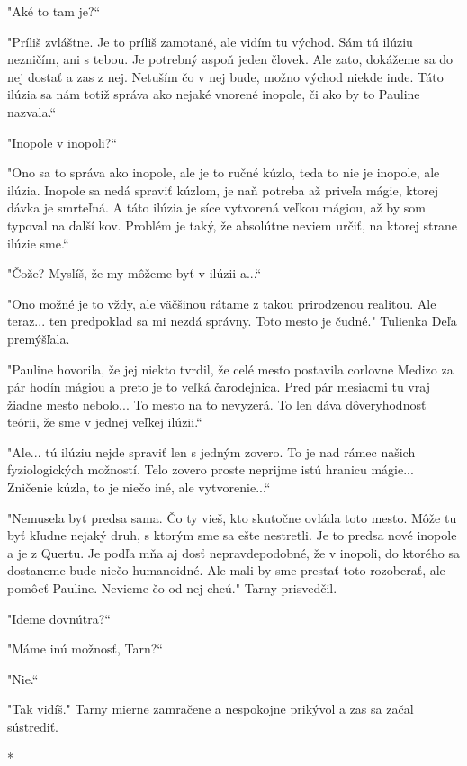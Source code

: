 \documentclass{book}
\begin{document}
"$ $Aké to tam je?“

"$ $Príliš zvláštne. Je to príliš zamotané, ale vidím tu východ. Sám tú ilúziu nezničím, ani s tebou. Je potrebný aspoň jeden človek. Ale zato, dokážeme sa do nej dostať a zas z nej. Netuším čo v nej bude, možno východ niekde inde. Táto ilúzia sa nám totiž správa ako nejaké vnorené inopole, či ako by to Pauline nazvala.“

"$ $Inopole v inopoli?“

"$ $Ono sa to správa ako inopole, ale je to ručné kúzlo, teda to nie je inopole, ale ilúzia. Inopole sa nedá spraviť kúzlom, je naň potreba až priveľa mágie, ktorej dávka je smrteľná. A táto ilúzia je síce vytvorená veľkou mágiou, až by som typoval na ďalší kov. Problém je taký, že absolútne neviem určiť, na ktorej strane ilúzie sme.“

"$ $Čože? Myslíš, že my môžeme byť v ilúzii a...“

"$ $Ono možné je to vždy, ale väčšinou rátame z takou prirodzenou realitou. Ale teraz... ten predpoklad sa mi nezdá správny. Toto mesto je čudné."$ $ Tulienka Deľa premýšľala.

"$ $Pauline hovorila, že jej niekto tvrdil, že celé mesto postavila corlovne Medizo za pár hodín mágiou a preto je to veľká čarodejnica. Pred pár mesiacmi tu vraj žiadne mesto nebolo... To mesto na to nevyzerá. To len dáva dôveryhodnosť teórii, že sme v jednej veľkej ilúzii.“

"$ $Ale... tú ilúziu nejde spraviť len s jedným zovero. To je nad rámec našich fyziologických možností. Telo zovero proste neprijme istú hranicu mágie... Zničenie kúzla, to je niečo iné, ale vytvorenie...“

"$ $Nemusela byť predsa sama. Čo ty vieš, kto skutočne ovláda toto mesto. Môže tu byť kľudne nejaký druh, s ktorým sme sa ešte nestretli. Je to predsa nové inopole a je z Quertu. Je podľa mňa aj dosť nepravdepodobné, že v inopoli, do ktorého sa dostaneme bude niečo humanoidné. Ale mali by sme prestať toto rozoberať, ale pomôcť Pauline. Nevieme čo od nej chcú."$ $ Tarny prisvedčil.

"$ $Ideme dovnútra?“

"$ $Máme inú možnosť, Tarn?“

"$ $Nie.“

"$ $Tak vidíš."$ $ Tarny mierne zamračene a nespokojne prikývol a zas sa začal sústrediť.

\begin{center}
*
\end{center}
\end{document}
